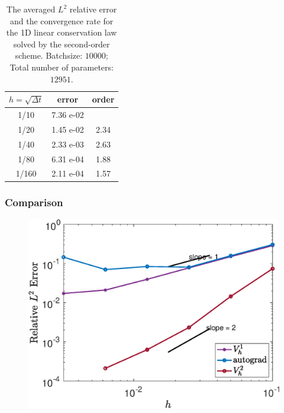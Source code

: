 \documentclass[aspectratio=169]{beamer}
\begin{document}
\begin{frame}
 \begin{table}[H]
	\centering 
	\begin{tabular}{|c|c|c|}
		\hline
		$h = \sqrt{\Delta t}$ & error & order \\
		\hline
		1/10 & 7.36 e-02 & \\
		1/20 & 1.45 e-02 & 2.34\\
		1/40 & 2.33 e-03 & 2.63\\
		1/80 & 6.31 e-04 & 1.88\\
		1/160& 2.11 e-04 & 1.57\\
		\hline
	\end{tabular}
	\caption{ The averaged $L^2$ relative error and the convergence rate for the 1D linear conservation law solved by the second-order scheme. Batchsize: $10000$; Total number of parameters: $12951$.}
	\label{tbl:linear cv law high_deep}
\end{table}
\end{frame}

\begin{frame}
\frametitle{Comparison}

    \begin{figure}[ht]
	\centering
	\includegraphics[width=0.7\linewidth]{Figure/Figure_linear_cv}
	\label{fig:1D_conservation_law}
    \end{figure}
\end{frame}
\end{document}

